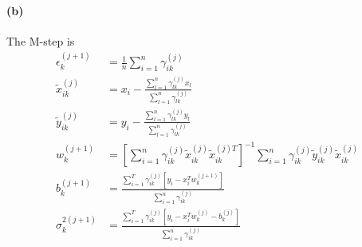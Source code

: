 \documentclass[12pt]{article}
\begin{document}
\paragraph{(b)}
The M-step is
\begin{align*}
    \epsilon_k^{(j+1)}&=\frac{1}{n}\sum_{i=1}^{n}\gamma_{ik}^{(j)}\\
    \tilde{x}_{ik}^{(j)}&=x_i-\frac{\sum_{l=1}^{n} \gamma_{lk}^{(j)}x_l}{\sum_{l=1}^{n} \gamma_{lk}^{(j)}}\\
    \tilde{y}_{ik}^{(j)}&=y_i-\frac{\sum_{l=1}^{n} \gamma_{lk}^{(j)}y_l}{\sum_{l=1}^{n} \gamma_{lk}^{(j)}}\\
    w_{k}^{(j+1)}&=\left[\sum_{i=1}^{n} \gamma_{ik}^{(j)} \tilde{x}_{ik}^{(j)}
    \tilde{x}_{ik}^{(j)T} \right]^{-1} \sum_{i=1}^{n} \gamma_{ik}^{(j)} \tilde{y}_{ik}^{(j)}\tilde{x}_{ik}^{(j)}\\
    b_{k}^{(j+1)}&=\frac{\sum_{i=1}^T \gamma_{ik}^{(j)}\left[y_i-x_i^T w_{k}^{(j+1)} \right]}{\sum_{i=1}^{n} \gamma_{ik}^{(j)}}\\
    \sigma_{k}^{2(j+1)}&=\frac{\sum_{i=1}^T \gamma_{ik}^{(j)}\left[y_i-x_i^T w_{k}^{(j)}-b_k^{(j)} \right]}{\sum_{i=1}^{n} \gamma_{ik}^{(j)}}
\end{align*}
\end{document}
